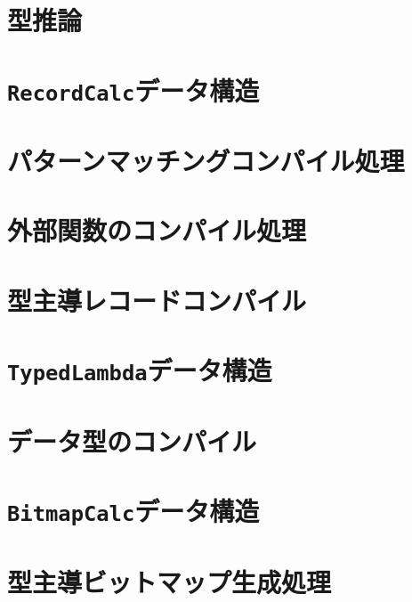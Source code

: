 \documentclass{jbook}
\newcommand{\txt}[2]{#1}
\newcommand{\code}[1]{\mbox{\large\tt #1}}
\begin{document}
\chapter{\txt
{型推論}
{Type Inferene}
}
\label{chap:typeinference}

\chapter{\txt
{\code{RecordCalc}データ構造}
{The \code{Recordcalc} data structure}
}
\label{chap:RecordCalc}

\chapter{\txt
{パターンマッチングコンパイル処理}
{Pattern Matching Compilation}
}
\label{chap:matchcompilation}

\chapter{\txt
{外部関数のコンパイル処理}
{Foreign function Compilation}
}
\label{chap:fficompilation}

\chapter{\txt
{型主導レコードコンパイル}
{Type-Directed Record Compilation}
}
\label{chap:recorcdcompilation}

\chapter{\txt
{\code{TypedLambda}データ構造}
{The \code{TypedLambda} data structure}
}
\label{chap:TypedLambda}

\chapter{\txt
{データ型のコンパイル}
{Datatype Compilation}
}
\label{chap:datatypecompilation}

\chapter{\txt
{\code{BitmapCalc}データ構造}
{The \code{BitmapCalc} data structure}
}
\label{chap:BitmapCalc}

\chapter{\txt
{型主導ビットマップ生成処理}
{Type-Directed Bitmap Generation}
}
\label{chap:bitmapgeneration}
\end{document}
